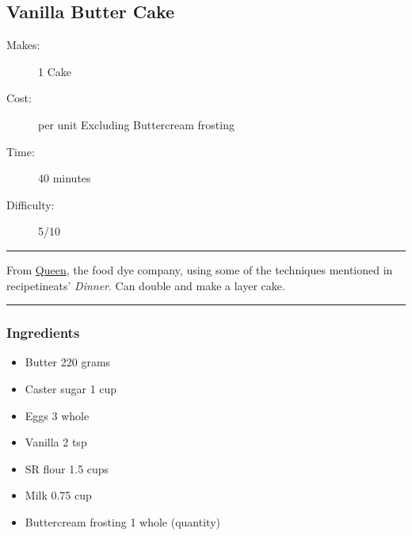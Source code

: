 \documentclass[]{article}
\begin{document}
\subsection*{\center\huge Vanilla Butter Cake}
\begin{description}
\item[Makes:] 1 Cake
\item[Cost:]  per unit Excluding Buttercream frosting
\item[Time:] 40 minutes
\item[Difficulty:] 5/10
\end{description}
\vspace{0.2cm}\hrule\vspace{0.5cm}
\begin{adjustwidth}{0.5 cm}{0.5 cm}

From \href{https://queen.com.au/recipes/perfect-vanilla-butter-cake/}{Queen}, the food dye company, using some of the techniques mentioned in recipetineats' \textit{Dinner}. Can double and make a layer cake. \hfill{}\color{black}

\end{adjustwidth}
\vspace{0.5cm}\hrule
\subsubsection*{\Large Ingredients}
\begin{multicols}{2}
\begin{itemize}
 \item Butter \hfill 220 grams
 \item Caster sugar \hfill 1 cup
 \item Eggs \hfill 3 whole
 \item Vanilla \hfill 2 tsp
 \item SR flour \hfill 1.5 cups
 \item Milk \hfill 0.75 cup
 \item Buttercream frosting \hfill 1 whole (quantity)
\end{itemize}
\end{multicols}
\end{document}
